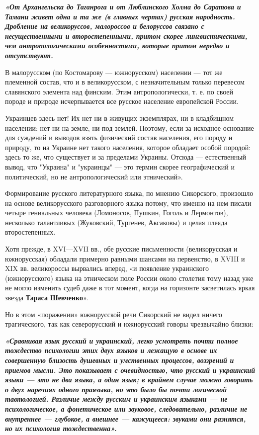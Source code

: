 \begin{leftbar}
  \begingroup
    \em\Large\color{blue}\bfseries
«От Архангельска до Таганрога и от Люблинского Холма до
Саратова и Тамани живет одна и та же (в главных чертах) русская народность.
Дробление на великоруссов, малороссов и белоруссов связано с несущественными и
второстепенными, притом скорее лингвистическими, чем антропологическими
особенностями, которые притом нередко и отсутствуют.

В малорусском (по Костомарову — южнорусском) населении — тот же племенной
состав, что и в великорусском, с незначительным только перевесом славянского
элемента над финским. Этим антропологически, т. е. по своей породе и природе
исчерпывается все русское население европейской России. 

Украинцев здесь нет! Их нет ни в живущих экземплярах, ни в кладбищном
населении: нет ни на земле, ни под землей. Поэтому, если за исходное основание
для суждений и выводов взять физический состав населения, его породу и природу,
то на Украине нет такого населения, которое обладает особой породой: здесь то
же, что существует и за пределами Украины. Отсюда — естественный вывод, что
"Украина" и "украинцы" — это термин скорее географический и политический, но не
антропологический или этнический».
  \endgroup
\end{leftbar}

Формирование русского литературного языка, по мнению Сикорского, произошло на
основе великорусского разговорного языка потому, что именно на нем писали
четыре гениальных человека (Ломоносов, Пушкин, Гоголь и Лермонтов), несколько
талантливых (Жуковский, Тургенев, Аксаковы) и целая плеяда второстепенных.

Хотя прежде, в XVI—XVII вв., обе русские письменности (великорусская и
южнорусская) обладали примерно равными шансами на первенство, в XVIII и XIX вв.
великороссы вырвались вперед, «и появление украинского (южнорусского) языка на
этническом поле России около столетия тому назад уже не могло изменить судеб
даже в тот момент, когда на горизонте засветилась яркая звезда \textbf{Тараса
Шевченко}».

Но в этом «поражении» южнорусской речи Сикорский не видел ничего трагического,
так как северорусский и южнорусский говоры чрезвычайно близки:

\begin{leftbar}
  \begingroup
    \em\Large\color{blue}\bfseries
«Сравнивая язык русский и украинский, легко усмотреть почти полное тождество психологии этих двух языков и лежащую в основе их совершенную близость душевных и умственных процессов, воззрений и приемов мысли. Это показывает с очевидностью, что русский и украинский языки — это не два языка, а один язык; в крайнем случае можно говорить о двух наречиях одного праязыка, но это было бы почти логической тавтологией. Различие между русским и украинским языками — не психологическое, а фонетическое или звуковое, следовательно, различие не внутреннее — глубокое, а внешнее — кажущееся: звуками они разнятся, но их психология тождественна».
  \endgroup
\end{leftbar}

